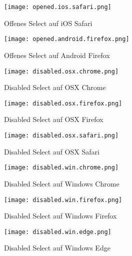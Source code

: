 \begin{figure}[!htb]
    \centering
    \begin{minipage}[b]{0.45\textwidth}
        \centering
        \texttt{[image: opened.ios.safari.png]}
        \caption{Offenes Select auf iOS Safari}
        \label{img:openedIosSafariSelect}
    \end{minipage}
    \hfill
    \begin{minipage}[b]{0.45\textwidth}
        \centering
        \texttt{[image: opened.android.firefox.png]}
        \caption{Offenes Select auf Android Firefox}
        \label{img:openedAndroidFirefoxSelect}
    \end{minipage}
\end{figure}


\begin{figure}[!htb]
    \centering
    \begin{minipage}[b]{0.28\textwidth}
        \centering
        \texttt{[image: disabled.osx.chrome.png]}
        \caption{Disabled Select auf OSX Chrome}
        \label{img:disabledOsxChromeSelect}
    \end{minipage}
    \hfill
    \begin{minipage}[b]{0.28\textwidth}
        \centering
        \texttt{[image: disabled.osx.firefox.png]}
        \caption{Disabled Select auf OSX Firefox}
        \label{img:disabledOsxFirefoxSelect}
    \end{minipage}
    \hfill
    \begin{minipage}[b]{0.28\textwidth}
        \centering
        \texttt{[image: disabled.osx.safari.png]}
        \caption{Disabled Select auf OSX Safari}
        \label{img:disabledOsxSafariSelect}
    \end{minipage}
\end{figure}

\begin{figure}[!htb]
    \centering
    \begin{minipage}[b]{0.28\textwidth}
        \centering
        \texttt{[image: disabled.win.chrome.png]}
        \caption{Disabled Select auf Windows Chrome}
        \label{img:disabledWinChromeSelect}
    \end{minipage}
    \hfill
    \begin{minipage}[b]{0.28\textwidth}
        \centering
        \texttt{[image: disabled.win.firefox.png]}
        \caption{Disabled Select auf Windows Firefox}
        \label{img:disabledWinFirefoxSelect}
    \end{minipage}
    \hfill
    \begin{minipage}[b]{0.28\textwidth}
        \centering
        \texttt{[image: disabled.win.edge.png]}
        \caption{Disabled Select auf Windows Edge}
        \label{img:disabledWinEdgeSelect}
    \end{minipage}
\end{figure}

